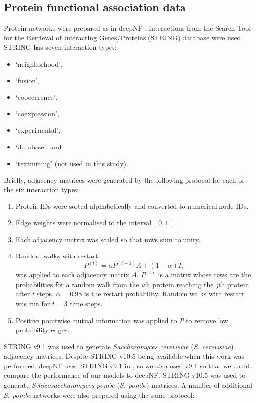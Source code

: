 \subsection{Protein functional association data}
\label{network-data}

Protein networks were prepared as in deepNF \cite{Gligorijevic2018}.
Interactions from the Search Tool for the Retrieval of Interacting Genes/Proteins (STRING) database \cite{Szklarczyk2017} were used.
STRING has seven interaction types:

\begin{itemize}
    \item `neighborhood',
    \item `fusion',
    \item `cooccurence',
    \item `coexpression',
    \item `experimental',
    \item `database', and
    \item `textmining' (not used in this study).
\end{itemize}

Briefly, adjacency matrices were generated by the following protocol for each of the six interaction types:

\begin{enumerate}
\item Protein IDs were sorted alphabetically and converted to numerical node IDs.
\item Edge weights were normalised to the interval $[0,1]$.
\item Each adjacency matrix was scaled so that rows sum to unity.
\item Random walks with restart
\[
P^{(t)} = \alpha P^{(t+1)}A + (1-\alpha)I,
\]
was applied to each adjacency matrix $A$.
$P^{(t)}$ is a matrix whose rows are the probabilities for a random walk from the $i$th protein reaching the $j$th protein after $t$ steps.
$\alpha=0.98$ is the restart probability.
Random walks with restart was run for $t=3$ time steps.
\item Positive pointwise mutual information was applied to $P$ to remove low probability edges.
\end{enumerate}

STRING v9.1 \cite{Franceschini2013} was used to generate \emph{Saccharomyces cerevisiae} (\emph{S. cerevisiae}) adjacency matrices.
Despite STRING v10.5 \cite{Szklarczyk2015} being available when this work was performed, deepNF used STRING v9.1 in \cite{Gligorijevic2018}, so we also used v9.1 so that we could compare the performance of our models to deepNF.
STRING v10.5 \cite{Szklarczyk2015} was used to generate \emph{Schizosaccharomyces pombe} (\emph{S. pombe}) matrices.
A number of additional \emph{S. pombe} networks were also prepared using the same protocol:

